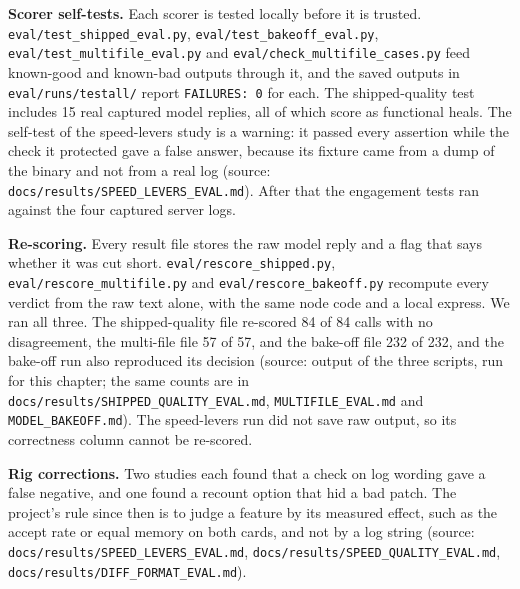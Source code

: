 \documentclass[11pt,a4paper]{report}
\begin{document}
\textbf{Scorer self-tests.} Each scorer is tested locally before it is trusted. \texttt{eval/\allowbreak{}test\_\allowbreak{}shipped\_\allowbreak{}eval.\allowbreak{}py}, \texttt{eval/\allowbreak{}test\_\allowbreak{}bakeoff\_\allowbreak{}eval.\allowbreak{}py}, \texttt{eval/\allowbreak{}test\_\allowbreak{}multifile\_\allowbreak{}eval.\allowbreak{}py} and \texttt{eval/\allowbreak{}check\_\allowbreak{}multifile\_\allowbreak{}cases.\allowbreak{}py} feed known-good and known-bad outputs through it, and the saved outputs in \texttt{eval/\allowbreak{}runs/\allowbreak{}testall/\allowbreak{}} report \texttt{FAILURES: 0} for each. The shipped-quality test includes 15 real captured model replies, all of which score as functional heals. The self-test of the speed-levers study is a warning: it passed every assertion while the check it protected gave a false answer, because its fixture came from a dump of the binary and not from a real log (source: \texttt{docs/\allowbreak{}results/\allowbreak{}SPEED\_\allowbreak{}LEVERS\_\allowbreak{}EVAL.\allowbreak{}md}). After that the engagement tests ran against the four captured server logs.

\textbf{Re-scoring.} Every result file stores the raw model reply and a flag that says whether it was cut short. \texttt{eval/\allowbreak{}rescore\_\allowbreak{}shipped.\allowbreak{}py}, \texttt{eval/\allowbreak{}rescore\_\allowbreak{}multifile.\allowbreak{}py} and \texttt{eval/\allowbreak{}rescore\_\allowbreak{}bakeoff.\allowbreak{}py} recompute every verdict from the raw text alone, with the same node code and a local express. We ran all three. The shipped-quality file re-scored 84 of 84 calls with no disagreement, the multi-file file 57 of 57, and the bake-off file 232 of 232, and the bake-off run also reproduced its decision (source: output of the three scripts, run for this chapter; the same counts are in \texttt{docs/\allowbreak{}results/\allowbreak{}SHIPPED\_\allowbreak{}QUALITY\_\allowbreak{}EVAL.\allowbreak{}md}, \texttt{MULTIFILE\_\allowbreak{}EVAL.\allowbreak{}md} and \texttt{MODEL\_\allowbreak{}BAKEOFF.\allowbreak{}md}). The speed-levers run did not save raw output, so its correctness column cannot be re-scored.

\textbf{Rig corrections.} Two studies each found that a check on log wording gave a false negative, and one found a recount option that hid a bad patch. The project's rule since then is to judge a feature by its measured effect, such as the accept rate or equal memory on both cards, and not by a log string (source: \texttt{docs/\allowbreak{}results/\allowbreak{}SPEED\_\allowbreak{}LEVERS\_\allowbreak{}EVAL.\allowbreak{}md}, \texttt{docs/\allowbreak{}results/\allowbreak{}SPEED\_\allowbreak{}QUALITY\_\allowbreak{}EVAL.\allowbreak{}md}, \texttt{docs/\allowbreak{}results/\allowbreak{}DIFF\_\allowbreak{}FORMAT\_\allowbreak{}EVAL.\allowbreak{}md}).
\end{document}
